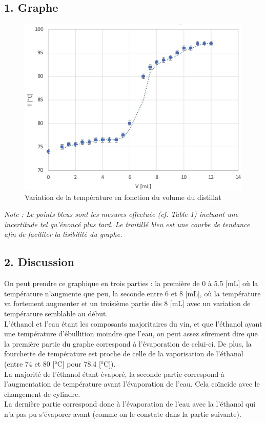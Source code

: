 \documentclass[11pt]{article}
\begin{document}
\subsection*{1. Graphe}
\begin{figure}[H]
\caption{Variation de la température en fonction du volume du distillat}
\includegraphics[scale=1]{SAVE_20211208_165531.jpg}
\end{figure}
\textit{Note : Le points bleus sont les mesures effectuée (cf. Table 1) incluant une incertitude tel qu'énoncé plus tard. Le traitillé bleu est une courbe de tendance afin de faciliter la lisibilité du graphe.}

\subsection*{2. Discussion}
On peut prendre ce graphique en trois parties : la première de 0 à 5.5 [mL] où la température n'augmente que peu, la seconde entre 6 et 8 [mL], où la température va fortement augmenter et un troisième partie dès 8 [mL] avec un variation de température semblable au début.\\ 
L'éthanol et l'eau étant les composants majoritaires du vin, et que l'éthanol ayant une température d'ébullition moindre que l'eau, on peut assez sûrement dire que la première partie du graphe correspond à l'évaporation de celui-ci. De plus, la fourchette de température est proche de celle de la vaporisation de l'éthanol (entre 74 et 80 [°C] pour 78.4 [°C]). \\
La majorité de l'éthanol étant évaporé, la seconde partie correspond à l'augmentation de température avant l'évaporation de l'eau. Cela coïncide avec le changement de cylindre. \\
La dernière partie correspond donc à l'évaporation de l'eau avec la l'éthanol qui n'a pas pu s'évaporer avant (comme on le constate dans la partie suivante).
\clearpage
\end{document}
